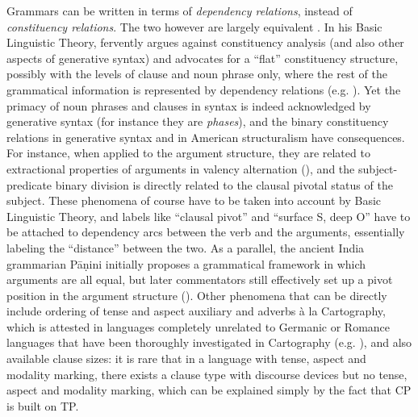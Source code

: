 \documentclass[UTF8, a4paper, oneside, scheme=plain, 12pt]{ctexrep}
\newcommand*{\citepage}[1]{p.~{#1}}
\newcommand*{\citepages}[1]{pp.~{#1}}
\newcommand*{\term}[1]{\emph{#1}}
\begin{document}
{Grammars can be written in terms of \emph{dependency relations}, instead of \emph{constituency relations}.
The two however are largely equivalent \citep{boston2009dependency}.
In his Basic Linguistic Theory, \citet{dixon2009basic} fervently argues against constituency analysis (and also other aspects of generative syntax) and advocates for a ``flat'' constituency structure, possibly with the levels of clause and noun phrase only,
where the rest of the grammatical information is represented by dependency relations 
(e.g. \citealt[\citepage{49}]{dixon2009basic}).
Yet the primacy of noun phrases and clauses in syntax is indeed acknowledged by generative syntax (for instance they are \term{phases}), and the binary constituency relations in generative syntax and in American structuralism have consequences.
For instance, when applied to the argument structure,
they are related to extractional properties of arguments in valency alternation (),
and the subject-predicate binary division is directly related to the clausal pivotal status of the subject.
These phenomena of course have to be taken into account by Basic Linguistic Theory,
and labels like ``clausal pivot'' and ``surface S, deep O'' have to be attached to dependency arcs between the verb and the arguments,
essentially labeling the ``distance'' between the two. 
As a parallel, the ancient India grammarian Pāṇini initially proposes a grammatical framework  in which arguments are all equal, but later commentators still effectively set up a pivot position in the argument structure ().
Other phenomena that can be directly include
ordering of tense and aspect auxiliary and adverbs à la Cartography, which is attested in languages completely unrelated to Germanic or Romance languages that have been thoroughly investigated in Cartography (e.g. \citealt[\citepages{166-167}]{grimm2021grammar}),
and also available clause sizes: it is rare that in a language with tense, aspect and modality marking,
there exists a clause type with discourse devices but no tense, aspect and modality marking,
which can be explained simply by the fact that CP is built on TP.

}
\end{document}
